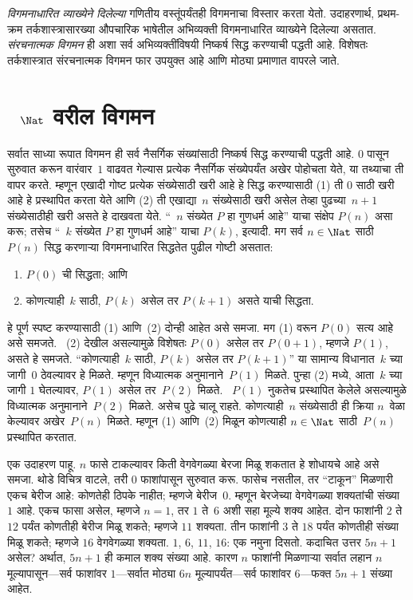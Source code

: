 \emph{विगमनाधारित व्याख्येने दिलेल्या} गणितीय वस्तूंपर्यंतही विगमनाचा विस्तार करता येतो. उदाहरणार्थ, प्रथम-क्रम तर्कशास्त्रासारख्या औपचारिक भाषेतील अभिव्यक्ती विगमनाधारित व्याख्येने दिलेल्या असतात. \emph{संरचनात्मक विगमन} ही अशा सर्व अभिव्यक्तींविषयी निष्कर्ष सिद्ध करण्याची पद्धती आहे. विशेषतः तर्कशास्त्रात संरचनात्मक विगमन फार उपयुक्त आहे आणि मोठ्या प्रमाणात वापरले जाते.












\section{~$\Nat$ वरील विगमन}\label{mth:ind:inN:sec}

सर्वात साध्या रूपात विगमन ही सर्व नैसर्गिक संख्यांसाठी निष्कर्ष सिद्ध करण्याची पद्धती आहे. $0$ पासून सुरुवात करून वारंवार~$1$ वाढवत गेल्यास प्रत्येक नैसर्गिक संख्येपर्यंत अखेर पोहोचता येते, या तथ्याचा ती वापर करते. म्हणून एखादी गोष्ट प्रत्येक संख्येसाठी खरी आहे हे सिद्ध करण्यासाठी (1) ती $0$ साठी खरी आहे हे प्रस्थापित करता येते आणि (2) ती एखाद्या~$n$ संख्येसाठी खरी असेल तेव्हा पुढच्या~$n+1$ संख्येसाठीही खरी असते हे दाखवता येते. “~$n$ संख्येत $P$ हा गुणधर्म आहे” याचा संक्षेप $P(n)$ असा करू; तसेच “~$k$ संख्येत $P$ हा गुणधर्म आहे” याचा $P(k)$, इत्यादी. मग सर्व $n \in \Nat$ साठी $P(n)$ सिद्ध करणाऱ्या विगमनाधारित सिद्धतेत पुढील गोष्टी असतात:
\begin{enumerate}
\item $P(0)$ ची सिद्धता; आणि
\item कोणत्याही~$k$ साठी, $P(k)$ असेल तर $P(k+1)$ असते याची सिद्धता.
\end{enumerate}
हे पूर्ण स्पष्ट करण्यासाठी (1) आणि~(2) दोन्ही आहेत असे समजा. मग (1) वरून $P(0)$ सत्य आहे असे समजते. ~(2) देखील असल्यामुळे विशेषतः $P(0)$ असेल तर $P(0+1)$, म्हणजे $P(1)$, असते हे समजते. “कोणत्याही~$k$ साठी, $P(k)$ असेल तर $P(k+1)$” या सामान्य विधानात~$k$ च्या जागी~$0$ ठेवल्यावर हे मिळते. म्हणून विध्यात्मक अनुमानाने~$P(1)$ मिळते. पुन्हा (2) मध्ये, आता~$k$ च्या जागी $1$ घेतल्यावर, $P(1)$ असेल तर~$P(2)$ मिळते. ~$P(1)$ नुकतेच प्रस्थापित केलेले असल्यामुळे विध्यात्मक अनुमानाने~$P(2)$ मिळते. असेच पुढे चालू राहते. कोणत्याही~$n$ संख्येसाठी ही क्रिया $n$~वेळा केल्यावर अखेर~$P(n)$ मिळते. म्हणून (1) आणि~(2) मिळून कोणत्याही $n \in \Nat$ साठी~$P(n)$ प्रस्थापित करतात.

एक उदाहरण पाहू. $n$ फासे टाकल्यावर किती वेगवेगळ्या बेरजा मिळू शकतात हे शोधायचे आहे असे समजा. थोडे विचित्र वाटले, तरी $0$ फाशांपासून सुरुवात करू. फासेच नसतील, तर “टाकून” मिळणारी एकच बेरीज आहे: कोणतेही ठिपके नाहीत; म्हणजे बेरीज~$0$. म्हणून बेरजेच्या वेगवेगळ्या शक्यतांची संख्या~$1$ आहे. एकच फासा असेल, म्हणजे $n=1$, तर $1$ ते~$6$ अशी सहा मूल्ये शक्य आहेत. दोन फाशांनी $2$ ते $12$ पर्यंत कोणतीही बेरीज मिळू शकते; म्हणजे $11$ शक्यता. तीन फाशांनी $3$ ते $18$ पर्यंत कोणतीही संख्या मिळू शकते; म्हणजे $16$ वेगवेगळ्या शक्यता. $1$, $6$, $11$, $16$: एक नमुना दिसतो. कदाचित उत्तर $5n+1$ असेल? अर्थात, $5n+1$ ही कमाल शक्य संख्या आहे. कारण $n$ फाशांनी मिळणाऱ्या सर्वात लहान $n$ मूल्यापासून---सर्व फाशांवर $1$---सर्वात मोठ्या $6n$ मूल्यापर्यंत---सर्व फाशांवर $6$---फक्त $5n+1$ संख्या आहेत.

